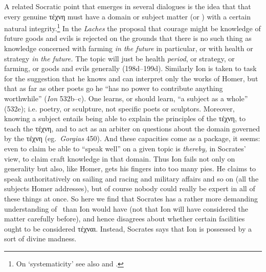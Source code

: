 \documentclass[11pt,letterpaper,oneside]{amsart} %
\begin{document}
A related Socratic point that emerges in several dialogues is the idea that  that every genuine τέχνη must have a domain or subject matter (or \pragma) with a certain natural integrity.\footnote{On `systematicity' see also \citet[71--2]{woodruff1990pse} and \citet[135--6]{asmith1998}.} In the \emph{Laches} the proposal that courage might be knowledge of future goods and evils is rejected on the grounds that there is no such thing as knowledge concerned with farming \emph{in the future} in particular, or with health or strategy \emph{in the future.} The topic will just be health \emph{period}, or strategy, or farming, or goods and evils generally (198d--199d). Similarly Ion is taken to task for the suggestion that he knows and can interpret only the works of Homer, but that as far as other poets go he ``has no power to contribute anything worthwhile'' (\emph{Ion} 532b--c). One learns, or should learn, ``a subject as a whole'' (532e); i.e. poetry, or sculpture, not specific poets or sculptors. Moreover, knowing a subject entails being able to explain the principles of the τέχνη, to teach the τέχνη, and to act as an arbiter on questions about the domain governed by the τέχνη (eg.\ \emph{Gorgias} 450). And these capacities come as a package, it seems: even to claim be able to ``speak well'' on a given topic is \emph{thereby,} in Socrates' view, to claim craft knowledge in that domain. Thus Ion fails not only on generality but also, like Homer, gets his fingers into too many pies. He claims to speak authoritatively on sailing and racing and military affairs and so on (all the subjects Homer addresses), but of course nobody could really be expert in all of these things at once. So here we find that Socrates has a rather more demanding understanding of \techne\ than Ion would have (not that Ion will have considered the matter carefully before), and hence disagrees about whether certain facilities ought to be considered τέχναι. Instead, Socrates says that Ion is possessed by a sort of divine madness.







\end{document}
